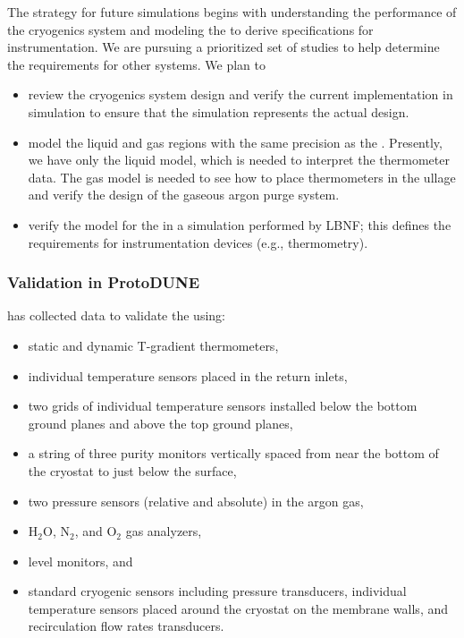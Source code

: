 The strategy for  future  simulations begins with understanding the performance of the  cryogenics system and modeling the  to derive specifications %
for instrumentation. We are pursuing a prioritized set of studies to help determine the requirements for other systems. We plan to 
\begin{itemize}
\item review the   cryogenics system design and verify the current implementation in simulation %
to ensure that the simulation represents the actual design.
\item 
model the  liquid and gas regions with the same precision as the . Presently, we have only the liquid model, which is needed to interpret the thermometer data. The gas model is needed to see how to place thermometers in the ullage and verify the design of the gaseous argon purge system.
\item verify the  model for the  in a simulation performed by LBNF; this defines the requirements for instrumentation devices (e.g., thermometry).
\end{itemize}


\subsubsection{Validation in ProtoDUNE}
\label{sec:cfdvalid}
 has collected data to validate the  using: %
\begin{itemize}
\item static and dynamic T-gradient thermometers, 
\item individual temperature sensors placed in the return  inlets, 
\item two \twod grids of individual temperature sensors installed below the bottom ground planes and above the top ground planes, 
\item a string of three purity monitors vertically spaced from near the bottom of the cryostat to just below the  surface,
\item two pressure sensors (relative and absolute) in the argon gas,
\item H$_{2}$O, N$_{2}$, and O$_{2}$ gas analyzers, 
\item {} level monitors, and
\item standard cryogenic sensors including pressure transducers, individual temperature sensors placed around
the cryostat on the membrane walls, and recirculation flow rates transducers.
\end{itemize}



